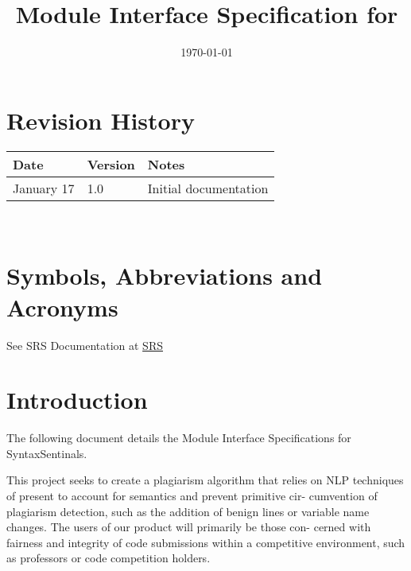 \documentclass[12pt, titlepage]{article}
\begin{document}
\title{Module Interface Specification for \progname{}}

\author{\authname}

\date{\today}

\maketitle


\section{Revision History}

\begin{tabularx}{\textwidth}{p{3cm}p{2cm}X}
\toprule {\bf Date} & {\bf Version} & {\bf Notes}\\
\midrule
January 17 & 1.0 & Initial documentation\\
\bottomrule
\end{tabularx}

~\newpage

\section{Symbols, Abbreviations and Acronyms}

See SRS Documentation at \href{https://github.com/SyntaxSentinels/SyntaxSentinels/blob/main/docs/SRS-Volere/SRS.pdf}{SRS}


\newpage

\tableofcontents

\newpage


\section{Introduction}

The following document details the Module Interface Specifications for SyntaxSentinals.

This project seeks to create a plagiarism algorithm that relies on NLP
techniques of present to account for semantics and prevent primitive cir-
cumvention of plagiarism detection, such as the addition of benign lines or
variable name changes. The users of our product will primarily be those con-
cerned with fairness and integrity of code submissions within a competitive
environment, such as professors or code competition holders.
\end{document}
